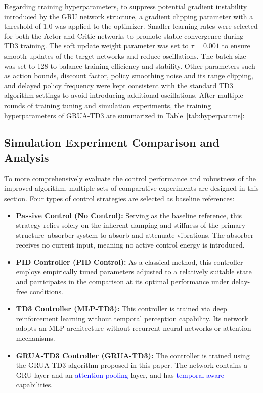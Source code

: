 \documentclass[review]{elsarticle}
\begin{document}
Regarding training hyperparameters, to suppress potential gradient instability introduced by the GRU network structure, a gradient clipping parameter with a threshold of 1.0 was applied to the optimizer. Smaller learning rates were selected for both the Actor and Critic networks to promote stable convergence during TD3 training. The soft update weight parameter was set to $\tau = 0.001$ to ensure smooth updates of the target networks and reduce oscillations. The batch size was set to 128 to balance training efficiency and stability. Other parameters such as action bounds, discount factor, policy smoothing noise and its range clipping, and delayed policy frequency were kept consistent with the standard TD3 algorithm settings to avoid introducing additional oscillations. After multiple rounds of training tuning and simulation experiments, the training hyperparameters of GRUA-TD3 are summarized in Table~\ref{tab:hyperparams}:

\subsection{Simulation Experiment Comparison and Analysis}

To more comprehensively evaluate the control performance and robustness of the improved algorithm, multiple sets of comparative experiments are designed in this section. Four types of control strategies are selected as baseline references:

\begin{itemize}
\item \textbf{Passive Control (No Control):} Serving as the baseline reference, this strategy relies solely on the inherent damping and stiffness of the primary structure--absorber system to absorb and attenuate vibrations. The absorber receives no current input, meaning no active control energy is introduced.

\item \textbf{PID Controller (PID Control):} As a classical method, this controller employs empirically tuned parameters adjusted to a relatively suitable state and participates in the comparison at its optimal performance under delay-free conditions.

\item \textbf{TD3 Controller (MLP-TD3):} This controller is trained via deep reinforcement learning without temporal perception capability. Its network adopts an MLP architecture without recurrent neural networks or attention mechanisms.

\item \textbf{GRUA-TD3 Controller (GRUA-TD3):} The controller is trained using the GRUA-TD3 algorithm proposed in this paper. The network contains a GRU layer and an \textcolor{blue}{attention pooling} layer, and has \textcolor{blue}{temporal-aware} capabilities.
\end{itemize}
\end{document}
